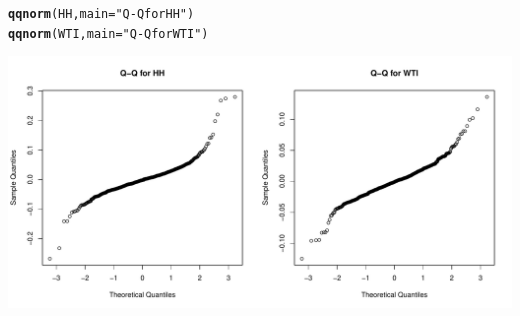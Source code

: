 \documentclass[10pt]{article}\usepackage[]{graphicx}\usepackage[]{color}
\makeatletter
\def\maxwidth{ %
  \ifdim\Gin@nat@width>\linewidth
    \linewidth
  \else
    \Gin@nat@width
  \fi
}
\newcommand{\hlstr}[1]{\textcolor[rgb]{0.192,0.494,0.8}{#1}}%
\newcommand{\hlstd}[1]{\textcolor[rgb]{0.345,0.345,0.345}{#1}}%
\newcommand{\hlkwc}[1]{\textcolor[rgb]{0.333,0.667,0.333}{#1}}%
\newcommand{\hlkwd}[1]{\textcolor[rgb]{0.737,0.353,0.396}{\textbf{#1}}}%
\newenvironment{kframe}{%
 \def\at@end@of@kframe{}%
 \ifinner\ifhmode%
  \def\at@end@of@kframe{\end{minipage}}%
  \begin{minipage}{\columnwidth}%
 \fi\fi%
 \def\FrameCommand##1{\hskip\@totalleftmargin \hskip-\fboxsep
 \colorbox{shadecolor}{##1}\hskip-\fboxsep
     \hskip-\linewidth \hskip-\@totalleftmargin \hskip\columnwidth}%
 \MakeFramed {\advance\hsize-\width
   \@totalleftmargin\z@ \linewidth\hsize
   \@setminipage}}%
 {\par\unskip\endMakeFramed%
 \at@end@of@kframe}
\newenvironment{knitrout}{}{} %
\makeatother
\begin{document}
\begin{knitrout}
{}


\begin{kframe}\begin{alltt}
\hlkwd{qqnorm}\hlstd{(HH,} \hlkwc{main} \hlstd{=} \hlstr{"Q-Q for HH"}\hlstd{)}
\hlkwd{qqnorm}\hlstd{(WTI,} \hlkwc{main} \hlstd{=} \hlstr{"Q-Q for WTI"}\hlstd{)}
\end{alltt}
\end{kframe}

{\centering \includegraphics[width=\maxwidth]{figure/unnamed-chunk-112} 

}



\end{knitrout}
\end{document}
